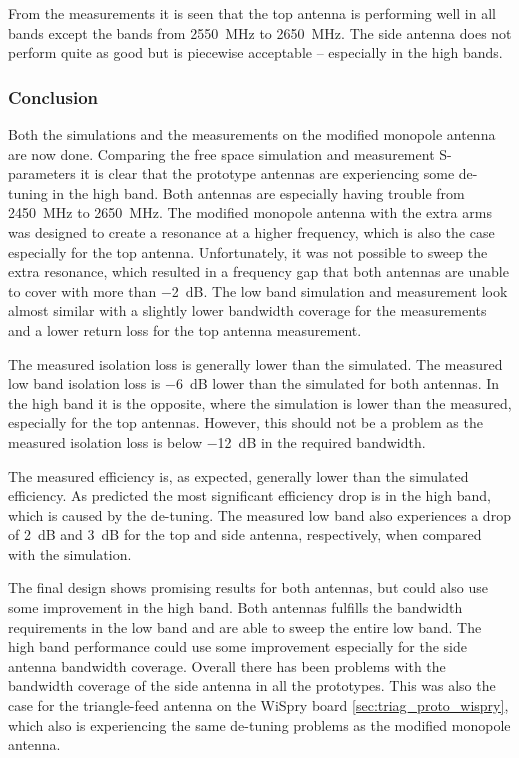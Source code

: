 
From the measurements it is seen that the top antenna is performing well in all bands except the bands from \SI{2550}{MHz} to \SI{2650}{MHz}. The side antenna does not perform quite as good but is piecewise acceptable -- especially in the high bands.

\subsubsection{Conclusion}
Both the simulations and the measurements on the modified monopole antenna are now done. Comparing the free space simulation and measurement S-parameters it is clear that the prototype antennas are experiencing some de-tuning in the high band. Both antennas are especially having trouble from \SI{2450}{MHz} to \SI{2650}{MHz}. The modified monopole antenna with the extra arms was designed to create a resonance at a higher frequency, which is also the case especially for the top antenna. Unfortunately, it was not possible to sweep the extra resonance, which resulted in a frequency gap that both antennas are unable to cover with more than \SI{-2}{dB}. The low band simulation and measurement look almost similar with a slightly lower bandwidth coverage for the measurements and a lower return loss for the top antenna measurement. 

The measured isolation loss is generally lower than the simulated. The measured low band isolation loss is \SI{-6}{dB} lower than the simulated for both antennas. In the high band it is the opposite, where the simulation is lower than the measured, especially for the top antennas. However, this should not be a problem as the measured isolation loss is below \SI{-12}{dB} in the required bandwidth.

The measured efficiency is, as expected, generally lower than the simulated efficiency. As predicted the most significant efficiency drop is in the high band, which is caused by the de-tuning. The measured low band also experiences a drop of \SI{2}{dB} and \SI{3}{dB} for the top and side antenna, respectively, when compared with the simulation.

The final design shows promising results for both antennas, but could also use some improvement in the high band. Both antennas fulfills the bandwidth requirements in the low band and are able to sweep the entire low band. The high band performance could use some improvement especially for the side antenna bandwidth coverage. Overall there has been problems with the bandwidth coverage of the side antenna in all the prototypes. This was also the case for the triangle-feed antenna on the WiSpry board \ref{sec:triag_proto_wispry}, which also is experiencing the same de-tuning problems as the modified monopole antenna. 





              